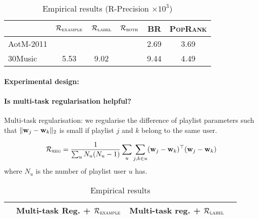 \begin{table}[!h]
\centering
\caption{Empirical results (R-Precision $\times 10^3$)}
\small
\begin{tabular}{l|ccccc}
\toprule
{}            & $\mathcal{R}_\textsc{example}$ & $\mathcal{R}_\textsc{label}$ & $\mathcal{R}_\textsc{both}$ & BR & \textsc{PopRank} \\
\midrule
AotM-2011     &  &  &  & 2.69 & 3.69 \\
30Music       & 5.53 & 9.02 &  & 9.44 & 4.49 \\
\bottomrule
\end{tabular}
\end{table}

\paragraph{Experimental design:}

\paragraph{Is multi-task regularisation helpful?}

Multi-task regularisation: we regularise the difference of playlist parameters 
such that $\|\mathbf{w}_j - \mathbf{w}_k\|_2$ is small if playlist $j$ and $k$ belong to the same user.

\begin{equation*}
\mathcal{R}_\textsc{reg} = \frac{1}{\sum_u N_u (N_u - 1)} \sum_u \sum_{j, k \in u} (\mathbf{w}_j - \mathbf{w}_k)^\top (\mathbf{w}_j - \mathbf{w}_k)
\end{equation*}
where $N_u$ is the number of playlist user $u$ has.

\begin{table}[!h]
\centering
\caption{Empirical results}
\begin{tabular}{l|ccc}
\toprule
{}            & Multi-task Reg. + $\mathcal{R}_\textsc{example}$ & Multi-task reg. + $\mathcal{R}_\textsc{label}$ \\
\midrule
\bottomrule
\end{tabular}
\end{table}
